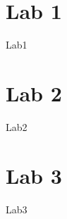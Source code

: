 \documentclass[12pt,a4paper]{article}
\begin{document}
	\tableofcontents
    \section{Lab 1}
    {Lab1}
    \section{Lab 2}
    {Lab2}
    \section{Lab 3}
    {Lab3}
\end{document}

